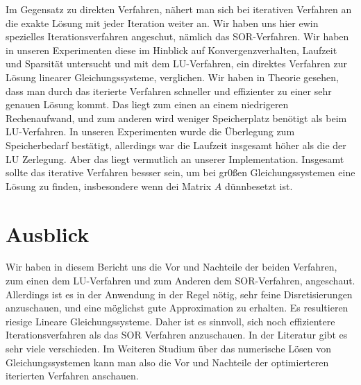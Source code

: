 \documentclass[smallheadings]{scrartcl}
\theoremstyle{definition}
\begin{document}
Im Gegensatz zu direkten Verfahren, nähert man sich bei iterativen Verfahren an die exakte Lösung mit jeder Iteration weiter an.  Wir haben uns hier ewin spezielles Iterationsverfahren angeschut, nämlich das SOR-Verfahren. Wir haben in unseren Experimenten diese im Hinblick auf Konvergenzverhalten, Laufzeit und Sparsität untersucht und mit dem LU-Verfahren, ein direktes Verfahren zur Lösung linearer Gleichungssysteme, verglichen.  Wir haben in Theorie gesehen, dass man durch das iterierte Verfahren schneller und effizienter zu einer sehr genauen Lösung kommt.  Das liegt zum einen an einem niedrigeren Rechenaufwand, und zum anderen wird weniger Speicherplatz benötigt als beim LU-Verfahren.  In unseren Experimenten wurde die Überlegung zum Speicherbedarf bestätigt, allerdings war die Laufzeit insgesamt höher als die der LU Zerlegung.  Aber das liegt vermutlich an unserer Implementation. Insgesamt sollte das iterative Verfahren bessser sein, um bei gr0ßen Gleichungssystemen eine Lösung zu finden, insbesondere wenn dei Matrix $A$ dünnbesetzt ist. 



\section{Ausblick}
Wir haben in diesem Bericht uns die Vor und Nachteile der beiden Verfahren, zum einen dem LU-Verfahren und zum Anderen dem SOR-Verfahren, angeschaut.  Allerdings ist es in der Anwendung in der Regel nötig,  sehr feine Disretisierungen anzuschauen, und eine möglichst gute Approximation zu erhalten.  Es resultieren riesige Lineare Gleichungssysteme. Daher ist es sinnvoll, sich noch effizientere Iterationsverfahren als das SOR Verfahren anzuschauen. In der Literatur gibt es sehr viele verschieden. Im Weiteren Studium über das numerische Lösen von Gleichungssystemen kann man also die Vor und Nachteile der optimierteren iterierten Verfahren anschauen. 



\printbibliography

\end{document}
